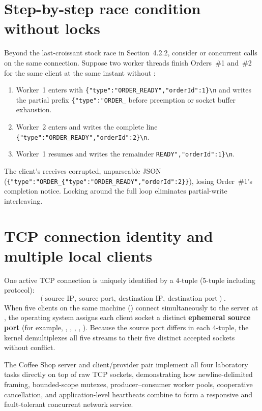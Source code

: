 \documentclass{../latex/utmreport}
\begin{document}
\section{Step-by-step race condition without locks}
Beyond the last-croissant stock race in Section~4.2.2, consider  or concurrent  calls on the same connection.
Suppose two worker threads finish Orders~\#1 and~\#2 for the same client at the same instant without :
\begin{enumerate}
  \item Worker~1 enters  with \lstinline|{"type":"ORDER_READY","orderId":1}\n| and writes the partial prefix \lstinline|{"type":"ORDER_| before preemption or socket buffer exhaustion.
  \item Worker~2 enters  and writes the complete line \lstinline|{"type":"ORDER_READY","orderId":2}\n|.
  \item Worker~1 resumes and writes the remainder \lstinline|READY","orderId":1}\n|.
\end{enumerate}
The client's  receives corrupted, unparseable JSON (\lstinline|{"type":"ORDER_{"type":"ORDER_READY","orderId":2}}|), losing Order~\#1's completion notice. Locking  around the full  loop eliminates partial-write interleaving.

\section{TCP connection identity and multiple local clients}
One active TCP connection is uniquely identified by a 4-tuple (5-tuple including protocol):
\[
(\text{source IP},\ \text{source port},\ \text{destination IP},\ \text{destination port}).
\]
When five clients on the same machine () connect simultaneously to the server at , the operating system assigns each client socket a distinct \textbf{ephemeral source port} (for example, , , , , ). Because the source port differs in each 4-tuple, the kernel demultiplexes all five streams to their five distinct accepted sockets without conflict.

\utmconclusions
The Coffee Shop server and client/provider pair implement all four laboratory tasks directly on top of raw TCP sockets, demonstrating how newline-delimited framing, bounded-scope mutexes, producer--consumer worker pools, cooperative  cancellation, and application-level heartbeats combine to form a responsive and fault-tolerant concurrent network service.
\end{document}
